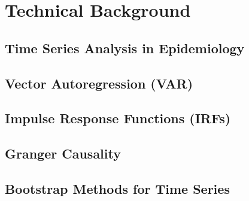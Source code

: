 \documentclass[11pt]{article}
\newcommand{\R}{\mathbb{R}}
\begin{document}
\section{Technical Background}

\subsection{Time Series Analysis in Epidemiology}

\subsection{Vector Autoregression (VAR)}

\subsection{Impulse Response Functions (IRFs)}

\subsection{Granger Causality}

\subsection{Bootstrap Methods for Time Series}
\end{document}
